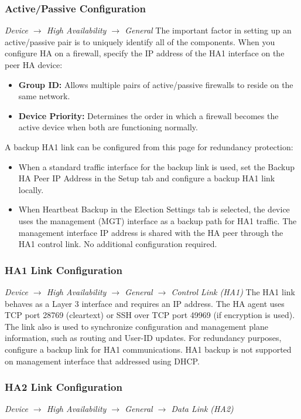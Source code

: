 \subsubsection{Active/Passive Configuration}
\textit{Device $\rightarrow$ High Availability $\rightarrow$ General}
\newline
The important factor in setting up an active/passive pair is to uniquely identify all of the components.
When you configure HA on a firewall, specify the IP address of the HA1 interface on the peer HA device:
\begin{itemize}
    \item \textbf{Group ID:} Allows multiple pairs of active/passive firewalls to reside on the same network.
    \item \textbf{Device Priority:} Determines the order in which a firewall becomes the active device when both are functioning normally.
\end{itemize}
A backup HA1 link can be configured from this page for redundancy protection:
\begin{itemize}
    \item When a standard traffic interface for the backup link is used, set the Backup HA Peer IP Address in the Setup tab and configure a backup HA1 link locally.
    \item When Heartbeat Backup in the Election Settings tab is selected, the device uses the management (MGT) interface as a backup path for HA1 traffic.
    The management interface IP address is shared with the HA peer through the HA1 control link. No additional configuration required.
\end{itemize}

\subsubsection{HA1 Link Configuration}
\textit{Device $\rightarrow$ High Availability $\rightarrow$ General $\rightarrow$ Control Link (HA1)}
\newline
The HA1 link behaves as a Layer 3 interface and requires an IP address.
The HA agent uses TCP port 28769 (cleartext) or SSH over TCP port 49969 (if encryption is used).
The link also is used to synchronize configuration and management plane information, such as routing and User-ID updates.
For redundancy purposes, configure a backup link for HA1 communications. 
HA1 backup is not supported on management interface that addressed using DHCP.

\subsubsection{HA2 Link Configuration}
\textit{Device $\rightarrow$ High Availability $\rightarrow$ General $\rightarrow$ Data Link (HA2)}

